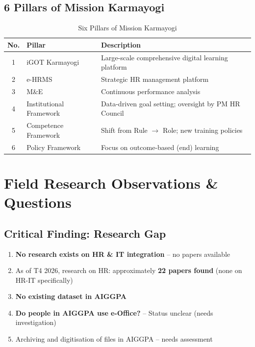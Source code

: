 \documentclass[12pt,a4paper]{article}
\begin{document}
\subsection{6 Pillars of Mission Karmayogi}

\begin{table}[h!]
\centering
\caption{Six Pillars of Mission Karmayogi}
\begin{tabularx}{\textwidth}{@{}clX@{}}
\toprule
\textbf{No.} & \textbf{Pillar} & \textbf{Description} \\
\midrule
1 & iGOT Karmayogi & Large-scale comprehensive digital learning platform \\
2 & e-HRMS & Strategic HR management platform \\
3 & M\&E & Continuous performance analysis \\
4 & Institutional Framework & Data-driven goal setting; oversight by PM HR Council \\
5 & Competence Framework & Shift from Rule $\rightarrow$ Role; new training policies \\
6 & Policy Framework & Focus on outcome-based (end) learning \\
\bottomrule
\end{tabularx}
\end{table}

\section{Field Research Observations \& Questions}

\subsection{Critical Finding: Research Gap}

\begin{criticalbox}
\begin{enumerate}[label=\textbf{(\arabic*)}]
  \item \textbf{No research exists on HR \& IT integration} -- no papers available
  \item As of T4 2026, research on HR: approximately \textbf{22 papers found} (none on HR-IT specifically)
  \item \textbf{No existing dataset in AIGGPA}
  \item \textbf{Do people in AIGGPA use e-Office?} -- Status unclear (needs investigation)
  \item Archiving and digitisation of files in AIGGPA -- needs assessment
\end{enumerate}
\end{criticalbox}
\end{document}
